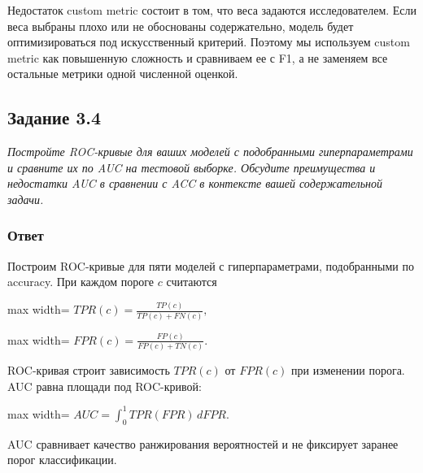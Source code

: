 \documentclass[11pt]{article}
\newenvironment{tasktext}
      {\begin{tcolorbox}[breakable, colback=black!3, colframe=black!28,
        boxrule=0.4pt, arc=1.5mm, left=7pt, right=7pt, top=5pt, bottom=5pt,
        before skip=0.35em, after skip=0.75em]\itshape}
      {\end{tcolorbox}}
\begin{document}
Недостаток custom metric состоит в том, что веса задаются
исследователем. Если веса выбраны плохо или не обоснованы содержательно,
модель будет оптимизироваться под искусственный критерий. Поэтому мы
используем custom metric как повышенную сложность и сравниваем ее с F1,
а не заменяем все остальные метрики одной численной оценкой.

    \subsection{Задание 3.4}\label{ux437ux430ux434ux430ux43dux438ux435-3.4}

\begin{tasktext}
Постройте ROC-кривые для ваших моделей с подобранными гиперпараметрами и
сравните их по AUC на тестовой выборке. Обсудите преимущества и
недостатки AUC в сравнении с ACC в контексте вашей содержательной
задачи.
\end{tasktext}

\subsubsection{Ответ}

Построим ROC-кривые для пяти моделей с гиперпараметрами, подобранными по
accuracy. При каждом пороге \(c\) считаются

\begin{center}
\begin{adjustbox}{max width=\linewidth}
\(\displaystyle TPR(c) = \frac{TP(c)}{TP(c) + FN(c)},\)
\end{adjustbox}
\end{center}

\begin{center}
\begin{adjustbox}{max width=\linewidth}
\(\displaystyle FPR(c) = \frac{FP(c)}{FP(c) + TN(c)}.\)
\end{adjustbox}
\end{center}

ROC-кривая строит зависимость \(TPR(c)\) от \(FPR(c)\) при изменении
порога. AUC равна площади под ROC-кривой:

\begin{center}
\begin{adjustbox}{max width=\linewidth}
\(\displaystyle AUC = \int_0^1 TPR(FPR)\,dFPR.\)
\end{adjustbox}
\end{center}

AUC сравнивает качество ранжирования вероятностей и не фиксирует заранее
порог классификации.
\end{document}
